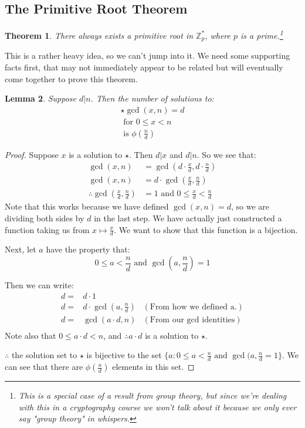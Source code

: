 \documentclass[10pt]{article}
\newcommand{\Z}{\mathbb{Z}}
\newtheorem{theorem}{Theorem}
\newtheorem{lemma}[theorem]{Lemma}
\theoremstyle{definition}
\theoremstyle{remark}
\def\Z{\mathbb{ Z}}
\begin{document}
\subsection{The Primitive Root Theorem}
\begin{theorem}\label{Primitive Root Theorem}
There always exists a primitive root in $\Z^{*}_p$, where $p$ is a prime.\footnote{This is a special case of a result from group theory, but since we're dealing with this in a cryptography course we won't talk about it because we only ever say "group theory" in whispers.}
\end{theorem}
This is a rather heavy idea, so we can't jump into it.  We need some supporting facts first, that may not immediately appear to be related but will eventually come together to prove this theorem.
\begin{lemma}
Suppose $d|n$.  Then the number of solutions to:
\begin{align*}
\star \gcd(x,n) = d \\ 
\text{ for } 0 \leq x < n\\
\text{ is } \phi(\frac{n}{d})
\end{align*}
\end{lemma}
\begin{proof}
Suppose $x$ is a solution to $\star$.  Then $d|x$ and $d|n$.  So we see that:
\begin{align*}
\gcd(x,n) &= \gcd(d \cdot \frac{x}{d}, d \cdot \frac{n}{d})\\
\gcd(x,n) &= d \cdot \gcd(\frac{x}{d},\frac{n}{d})\\
\therefore \gcd(\frac{x}{d},\frac{n}{d}) &= 1 \text{  and } 0 \leq \frac{x}{d} < \frac{n}{d}
\end{align*}
Note that this works because we have defined $\gcd(x,n) = d$, so we are dividing both sides by $d$ in the last step.  We have actually just constructed a function taking us from $x \mapsto \frac{x}{d}$.  We want to show that this function is a bijection.

Next, let $a$ have the property that: $$ 0\leq a < \frac{n}{d} \text{ and } \gcd(a, \frac{n}{d}) = 1$$

Then we can write:
\begin{align*}
d =& d \cdot 1\\
d =& d \cdot \gcd(a, \frac{n}{d})  &(\text{From how we defined a.})\\
d =& \gcd(a \cdot d, n) &(\text{From our gcd identities})\\
\end{align*}
Note also that $0 \leq a \cdot d < n$, and $\therefore a \cdot d$ is a solution to $\star$.

$\therefore$ the solution set to $\star$ is bijective to the set $\{a: 0 \leq a < \frac{n}{d} \text{ and } \gcd(a, \frac{n}{d}=1\}$.  We can see that there are $\phi(\frac{n}{d})$ elements in this set.
\end{proof}
\end{document}

